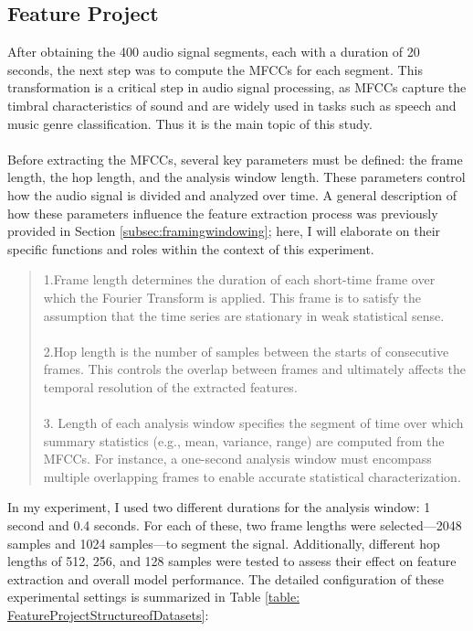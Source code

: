 \subsection{Feature Project}\label{subsec:FP}
After obtaining the 400 audio signal segments, each with a duration of 20 seconds, the next step was to compute the MFCCs for each segment. This transformation is a critical step in audio signal processing, as MFCCs capture the timbral characteristics of sound and are widely used in tasks such as speech and music genre classification. Thus it is the main topic of this study. \\
\\
Before extracting the MFCCs, several key parameters must be defined: the frame length, the hop length, and the analysis window length. These parameters control how the audio signal is divided and analyzed over time. A general description of how these parameters influence the feature extraction process was previously provided in Section \ref{subsec:framingwindowing}; here, I will elaborate on their specific functions and roles within the context of this experiment.\\
\begin{quote}
	1.Frame length determines the duration of each short-time frame over which the Fourier Transform is applied. This frame is to satisfy the assumption that the time series are stationary in weak statistical sense.\\
	\\
	2.Hop length is the number of samples between the starts of consecutive frames. This controls the overlap between frames and ultimately affects the temporal resolution of the extracted features.\\
	\\
	3. Length of each analysis window specifies the segment of time over which summary statistics (e.g., mean, variance, range) are computed from the MFCCs. For instance, a one-second analysis window must encompass multiple overlapping frames to enable accurate statistical characterization. 
\end{quote}
In my experiment, I used two different durations for the analysis window: 1 second and 0.4 seconds. For each of these, two frame lengths were selected—2048 samples and 1024 samples—to segment the signal. Additionally, different hop lengths of 512, 256, and 128 samples were tested to assess their effect on feature extraction and overall model performance. The detailed configuration of these experimental settings is summarized in Table \ref{table: FeatureProjectStructureofDatasets}: 
